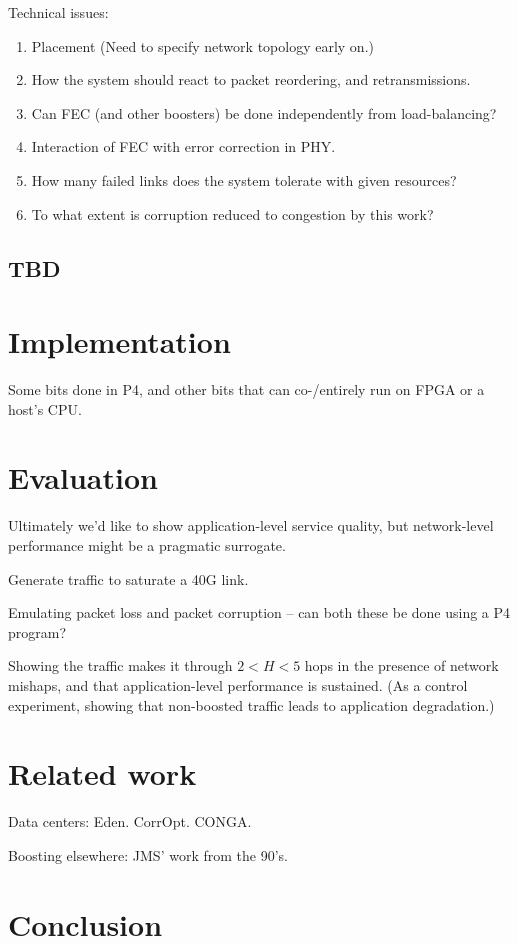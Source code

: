 \documentclass[sigconf]{acmart}
\begin{document}
Technical issues:
\begin{enumerate}
  \item Placement (Need to specify network topology early on.)
  \item How the system should react to packet reordering, and retransmissions.
  \item Can FEC (and other boosters) be done independently from load-balancing?
  \item Interaction of FEC with error correction in PHY.
  \item How many failed links does the system tolerate with given resources?
  \item To what extent is corruption reduced to congestion by this work?
\end{enumerate}

\subsection{TBD}

\section{Implementation}
Some bits done in P4, and other bits that can co-/entirely run on FPGA or a host's CPU.

\section{Evaluation}
Ultimately we'd like to show application-level service quality, but
network-level performance might be a pragmatic surrogate.

Generate traffic to saturate a 40G link.

Emulating packet loss and packet corruption -- can both these be done using a P4 program?

Showing the traffic makes it through $2 < H < 5$ hops in the presence of
network mishaps, and that application-level performance is sustained.
(As a control experiment, showing that non-boosted traffic leads to application degradation.)

\section{Related work}
Data centers:
Eden.
CorrOpt.
CONGA.

Boosting elsewhere: JMS' work from the 90's.

\section{Conclusion}


 
\end{document}

